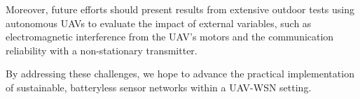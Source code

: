 \documentclass[conference]{IEEEtran}
\begin{document}
Moreover, future efforts should present results from extensive outdoor tests using autonomous UAVs to evaluate the impact of external variables, such as electromagnetic interference from the UAV's motors and the communication reliability with a non-stationary transmitter.

By addressing these challenges, we hope to advance the practical implementation of sustainable, batteryless sensor networks within a UAV-WSN setting.

% 
% 
\end{document}
